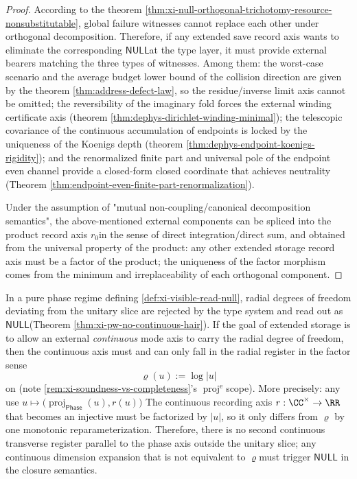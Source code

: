 \begin{proof}
According to the theorem \ref{thm:xi-null-orthogonal-trichotomy-resource-nonsubstitutable}, global failure witnesses cannot replace each other under orthogonal decomposition. Therefore, if any extended save record axis wants to eliminate the corresponding \(\mathsf{NULL}\) ​​at the type layer, it must provide external bearers matching the three types of witnesses.
Among them: the worst-case scenario and the average budget lower bound of the collision direction are given by the theorem \ref{thm:address-defect-law}, so the residue/inverse limit axis cannot be omitted; the reversibility of the imaginary fold forces the external winding certificate axis (theorem \ref{thm:dephys-dirichlet-winding-minimal}); the telescopic covariance of the continuous accumulation of endpoints is locked by the uniqueness of the Koenigs depth (theorem \ref{thm:dephys-endpoint-koenigs-rigidity}); and the renormalized finite part and universal pole of the endpoint even channel provide a closed-form closed coordinate that achieves neutrality (Theorem \ref{thm:endpoint-even-finite-part-renormalization}).
\par
Under the assumption of "mutual non-coupling/canonical decomposition semantics", the above-mentioned external components can be spliced ​​into the product record axis \(r_0\) ​​in the sense of direct integration/direct sum, and obtained from the universal property of the product: any other extended storage record axis must be a factor of the product; the uniqueness of the factor morphism comes from the minimum and irreplaceability of each orthogonal component.
\end{proof}

\begin{corollary}\label{cor:xi-unique-continuous-transverse-register}
In a pure phase regime defining \ref{def:xi-visible-read-null}, radial degrees of freedom deviating from the unitary slice are rejected by the type system and read out as \(\mathsf{NULL}\) ​​(Theorem \ref{thm:xi-pw-no-continuous-hair}).
If the goal of extended storage is to allow an external \emph{continuous} mode axis to carry the radial degree of freedom, then the continuous axis must and can only fall in the radial register in the factor sense
\[
\varrho(u):=\log|u|
\]
on (note \ref{rem:xi-soundness-vs-completeness}’s \(\operatorname{proj}^{\mathrm e}\) ​​scope).
More precisely: any use
\(
u\mapsto \bigl(\operatorname{proj}_{\mathsf{Phase}}(u),r(u)\bigr)
\)
The continuous recording axis \(r:\CC^\times\to\RR\) ​​that becomes an injective must be factorized by \(|u|\), so it only differs from \(\varrho\) by one monotonic reparameterization.
Therefore, there is no second continuous transverse register parallel to the phase axis outside the unitary slice; any continuous dimension expansion that is not equivalent to \(\varrho\) ​​must trigger \(\mathsf{NULL}\) in the closure semantics.
\end{corollary}

